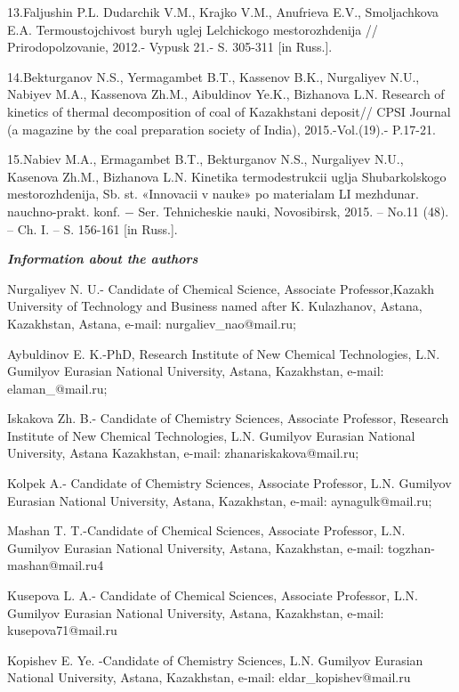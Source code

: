 13.Faljushin P.L. Dudarchik V.M., Krajko V.M., Anufrieva E.V.,
Smoljachkova E.A. Termoustojchivost\textquotesingle{} buryh uglej
Lel\textquotesingle chickogo mestorozhdenija //
Prirodopol\textquotesingle zovanie, 2012.- Vypusk 21.- S. 305-311 {[}in
Russ.{]}.

14.Bekturganov N.S., Yermagambet B.T., Kassenov B.K., Nurgaliyev N.U.,
Nabiyev M.A., Kassenova Zh.M., Aibuldinov Ye.K., Bizhanova L.N. Research
of kinetics of thermal decomposition of coal of Kazakhstani deposit//
CPSI Journal (a magazine by the coal preparation society of India),
2015.-Vol.(19).- P.17-21.

15.Nabiev M.A., Ermagambet B.T., Bekturganov N.S., Nurgaliyev N.U.,
Kasenova Zh.M., Bizhanova L.N. Kinetika termodestrukcii uglja
Shubarkol\textquotesingle skogo mestorozhdenija, Sb. st. «Innovacii v
nauke» po materialam LI mezhdunar. nauchno-prakt. konf. − Ser.
Tehnicheskie nauki, Novosibirsk, 2015. -- No.11 (48). -- Ch. I. -- S.
156-161 {[}in Russ.{]}.

\emph{{\bfseries Information about the authors}}

Nurgaliyev N. U.- Candidate of Chemical Science, Associate
Professor,Kazakh University of Technology and Business named after K.
Kulazhanov, Astana, Kazakhstan, Astana, e-mail: nurgaliev\_nao@mail.ru;

Aybuldinov E. K.-PhD, Research Institute of New Chemical Technologies,
L.N. Gumilyov Eurasian National University, Astana, Kazakhstan, e-mail:
elaman\_@mail.ru;

Iskakova Zh. B.- Candidate of Chemistry Sciences, Associate Professor,
Research Institute of New Chemical Technologies, L.N. Gumilyov Eurasian
National University, Astana Kazakhstan, e-mail: zhanariskakova@mail.ru;

Kolpek A.- Candidate of Chemistry Sciences, Associate Professor, L.N.
Gumilyov Eurasian National University, Astana, Kazakhstan, e-mail:
aynagulk@mail.ru;

Mashan T. T.-Candidate of Chemical Sciences, Associate Professor, L.N.
Gumilyov Eurasian National University, Astana, Kazakhstan, e-mail:
togzhan-mashan@mail.ru4

Kusepova L. A.- Candidate of Chemical Sciences, Associate Professor,
L.N. Gumilyov Eurasian National University, Astana, Kazakhstan, e-mail:
kusepova71@mail.ru

Kopishev E. Ye. -Candidate of Chemistry Sciences, L.N. Gumilyov Eurasian
National University, Astana, Kazakhstan, e-mail: eldar\_kopishev@mail.ru

